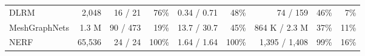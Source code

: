 \begin{tabular}{lrrrrrrrr}
\multicolumn{1}{l|}{DLRM}          & \multicolumn{1}{r|}{2,048}                                     & 16 / 21                                                                                  & \multicolumn{1}{r|}{76\%}                                                                & 0.34 / 0.71                                                                                       & \multicolumn{1}{r|}{48\%}                                                                 & 74 / 159                                                                                           & \multicolumn{1}{r|}{46\%}                                                                     & 7\%                                                                                         \\

\multicolumn{1}{l|}{MeshGraphNets} & \multicolumn{1}{r|}{1.3 M}                                     & 90 / 473                                                                                 & \multicolumn{1}{r|}{19\%}                                                                & 13.7 / 30.7                                                                                       & \multicolumn{1}{r|}{45\%}                                                                 & 864 K / 2.3 M                                                                                       & \multicolumn{1}{r|}{37\%}                                                                     & 11\%                                                                                        \\

\multicolumn{1}{l|}{NERF}          & \multicolumn{1}{r|}{65,536}                                    & 24 / 24                                                                                  & \multicolumn{1}{r|}{100\%}                                                               & 1.64 / 1.64                                                                                       & \multicolumn{1}{r|}{100\%}                                                                & 1,395 / 1,408                                                                                       & \multicolumn{1}{r|}{99\%}                                                                     & 16\%                                                                                        \\


\end{tabular}
